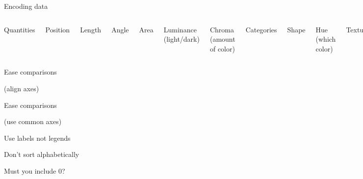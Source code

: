 \documentclass[aspectratio=169,12pt,t]{beamer}
\begin{document}
\begin{frame}{Encoding data}

\begin{columns}

{\hilit Quantities}

\bi
\item Position
\item Length
\item Angle
\item Area
\item Luminance {\lolit (light/dark)}
\item Chroma {\lolit (amount of color)}
\ei


{\hilit Categories}

\bi
\item Shape
\item Hue {\lolit (which color)}
\item Texture
\item Width
\ei

  \end{columns}

\note{
}
\end{frame}




\begin{frame}{Ease comparisons}

{\hilit (align axes)}


\note{
}
\end{frame}




\begin{frame}{Ease comparisons}

{\hilit (use common axes)}


\note{
}
\end{frame}







\begin{frame}[c]{Use labels not legends}


\note{
}
\end{frame}





\begin{frame}[c]{Don't sort alphabetically}


\note{
}
\end{frame}





\begin{frame}[c]{Must you include 0?}


\note{
}
\end{frame}
\end{document}
